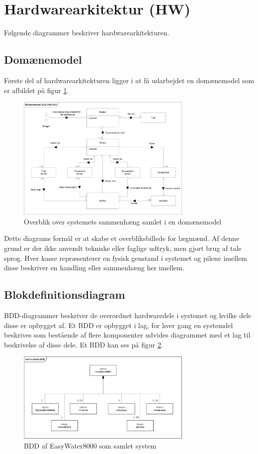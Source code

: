 \section{Hardwarearkitektur (HW)}
Følgende diagrammer beskriver hardwarearkitekturen.

\subsection{Domænemodel}
Første del af hardwarearkitekturen ligger i at få udarbejdet en domænemodel som er afbildet	 på figur \ref{lab:Domainmodel}.

\begin{figure}[H]
  \centering
    \includegraphics[width=0.75\textwidth]{Billeder/Domainmodel}
    \caption{Overblik over systemets sammenhæng samlet i en domænemodel}
    \label{lab:Domainmodel}
\end{figure}

Dette diagrams formål er at skabe et overbliksbillede for lægmænd. Af denne grund er der ikke anvendt tekniske eller faglige udtryk, men gjort brug af tale sprog. Hver kasse repræsenterer en fysisk genstand i systemet og pilene imellem disse beskriver en handling eller sammenhæng her imellem.

\subsection{Blokdefinitionsdiagram}
BDD-diagrammer beskriver de overordnet hardwaredele i systemet og hvilke dele disse er opbygget af. Et BDD er opbygget i lag, for hver gang en systemdel beskrives som bestående af flere komponenter udvides diagrammet med et lag til beskrivelse af disse dele. Et BDD kan ses på figur \ref{lab:BDD}. 

\begin{figure}[H]
  \centering
    \includegraphics[width=0.75\textwidth]{Billeder/BDD}
    \caption{BDD af EasyWater8000 som samlet system}
    \label{lab:BDD}
\end{figure}

